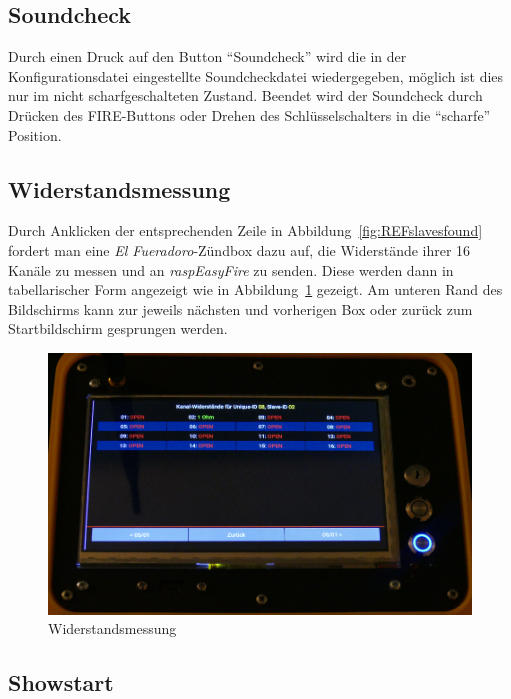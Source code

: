 \documentclass[paper=a4, parskip, numbers=noenddot, toc=listof, headsepline]{scrbook}
\newcommand{\anlage}{\emph{El Fueradoro}}
\newcommand{\REF}{\emph{raspEasyFire}}
\begin{document}
			\subsection{Soundcheck}
			
				Durch einen Druck auf den Button \enquote{Soundcheck} wird die in der Konfigurationsdatei eingestellte Soundcheckdatei wiedergegeben, möglich ist dies nur im nicht scharfgeschalteten Zustand. Beendet wird der Soundcheck durch Drücken des FIRE-Buttons oder Drehen des Schlüsselschalters in die \enquote{scharfe} Position.		

			\subsection{Widerstandsmessung}
			
				Durch Anklicken der entsprechenden Zeile in Abbildung~\ref{fig:REFslavesfound} fordert man eine {\anlage}-Zündbox dazu auf, die Widerstände ihrer 16 Kanäle zu messen und an {\REF} zu senden. Diese werden dann in tabellarischer Form angezeigt wie in Abbildung~\ref{fig:REFimpedances} gezeigt. Am unteren Rand des Bildschirms kann zur jeweils nächsten und vorherigen Box oder zurück zum Startbildschirm gesprungen werden.
				
				\begin{figure}
					\centering\includegraphics[width=150mm]{Bilder/REFimpedances}
					\caption{Widerstandsmessung}
					\label{fig:REFimpedances}
				\end{figure}
			
				
			
			\subsection{Showstart}
\end{document}
